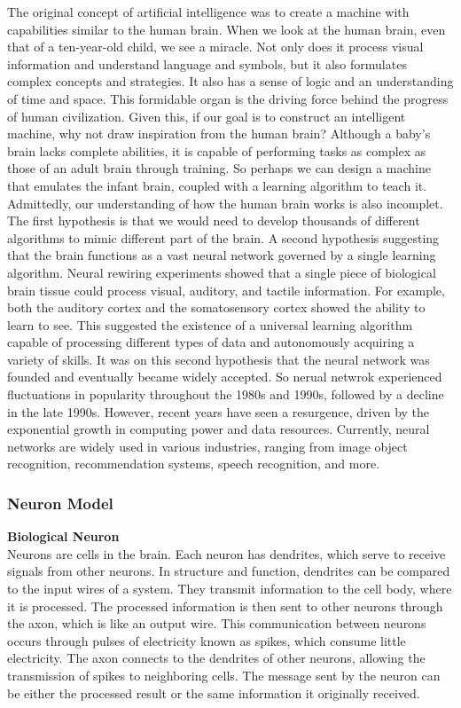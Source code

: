 \documentclass{article}
\begin{document}
    The original concept of artificial intelligence was to create a machine with capabilities similar to the human brain. When we look at the human brain, even that of a ten-year-old child, we see a miracle. Not only does it process visual information and understand language and symbols, but it also formulates complex concepts and strategies. It also has a sense of logic and an understanding of time and space. This formidable organ is the driving force behind the progress of human civilization. Given this, if our goal is to construct an intelligent machine, why not draw inspiration from the human brain? Although a baby's brain lacks complete abilities, it is capable of performing tasks as complex as those of an adult brain through training. So perhaps we can design a machine that emulates the infant brain, coupled with a learning algorithm to teach it. Admittedly, our understanding of how the human brain works is also incomplet. The first hypothesis is that we would need to develop thousands of different algorithms to mimic different part of the brain. A second hypothesis suggesting that the brain functions as a vast neural network governed by a single learning algorithm. Neural rewiring experiments showed that a single piece of biological brain tissue could process visual, auditory, and tactile information. For example, both the auditory cortex and the somatosensory cortex showed the ability to learn to see. This suggested the existence of a universal learning algorithm capable of processing different types of data and autonomously acquiring a variety of skills. It was on this second hypothesis that the neural network was founded and eventually became widely accepted. So nerual netwrok experienced fluctuations in popularity throughout the 1980s and 1990s, followed by a decline in the late 1990s. However, recent years have seen a resurgence, driven by the exponential growth in computing power and data resources. Currently, neural networks are widely used in various industries, ranging from image object recognition, recommendation systems, speech recognition, and more.



    \newpage
	\subsubsection{Neuron Model}

    \textbf{Biological Neuron}\\
    Neurons are cells in the brain. Each neuron has dendrites, which serve to receive signals from other neurons. In structure and function, dendrites can be compared to the input wires of a system. They transmit information to the cell body, where it is processed. The processed information is then sent to other neurons through the axon, which is like an output wire. This communication between neurons occurs through pulses of electricity known as spikes, which consume little electricity. The axon connects to the dendrites of other neurons, allowing the transmission of spikes to neighboring cells. The message sent by the neuron can be either the processed result or the same information it originally received.
\end{document}
